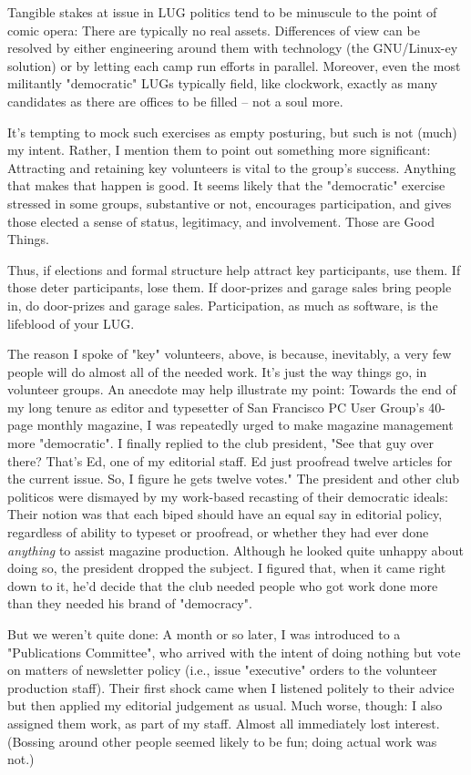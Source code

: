 Tangible stakes at issue in LUG politics tend to be minuscule to the point of
comic opera:  There are typically no real assets. Differences of view 
can be resolved by either engineering around them with technology (the GNU/Linux-ey
solution) or by letting each camp run efforts in parallel. Moreover, even the
most militantly "democratic" LUGs typically field, like clockwork,
exactly as many candidates as there are offices to be filled -- not a
soul more.

It's tempting to mock such exercises as empty posturing, but such
is not (much) my intent.  Rather, I
mention them to point out something more significant:  Attracting and 
retaining key volunteers is vital to the group's success.  Anything that 
makes that happen is good.  It seems likely that the
"democratic" exercise stressed in some groups, substantive or not,
encourages participation, and gives those elected a sense of status,
legitimacy, and involvement.  Those are Good Things.  

Thus, if elections and formal structure help attract key
participants, use them.  If those deter participants, 
lose them.  If door-prizes and garage sales bring people in, do
door-prizes and garage sales.  Participation, as much as software, is
the lifeblood of your LUG. 

The reason I spoke of "key" volunteers, above, is because, inevitably, a
very few people will do almost all of the needed work.  It's just the
way things go, in volunteer groups. An anecdote may help illustrate my
point:  Towards the end of my long tenure as editor and typesetter of
San Francisco PC User Group's 40-page monthly magazine, I was repeatedly
urged to make magazine management more "democratic".  I finally replied
to the club president, "See that guy over there?  That's Ed, one of my
editorial staff.  Ed just proofread twelve articles for the current
issue.  So, I figure he gets twelve votes."  The president and other
club politicos were dismayed by my work-based recasting of their
democratic ideals: Their notion was that each biped should have an equal
say in editorial policy, regardless of ability to typeset or proofread,
or whether they had ever done {\itshape anything\/} to assist magazine
production. Although he looked quite unhappy about doing so, the
president dropped the subject.  I figured that, when it came right down
to it, he'd decide that the club needed people who got work done more
than they needed his brand of "democracy".

But we weren't quite done:  A month or so later, I was introduced to a 
"Publications Committee", who arrived with the intent of doing nothing but 
vote on matters of newsletter policy (i.e., issue "executive" orders to the 
volunteer production staff).  Their first shock came when I listened politely 
to their advice but then applied my editorial judgement as usual.  Much 
worse, though:  I also assigned them work, as part of my staff.  Almost 
all immediately lost interest. (Bossing around other people seemed likely 
to be fun; doing actual work was not.)

